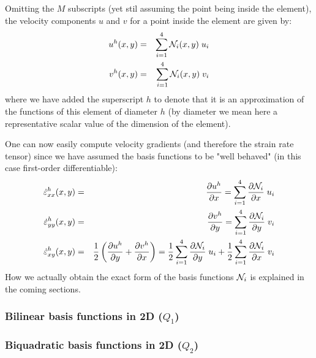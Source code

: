 Omitting the $M$ subscripts (yet stil assuming the point being inside the element), the velocity 
components $u$ and $v$ for a point inside the element
 are given by:
\begin{eqnarray}
u^h(x,y) &=& \sum_{i=1}^4 {\mathcal{N}}_i(x,y)\;  u_i \\
v^h(x,y) &=& \sum_{i=1}^4 {\mathcal{N}}_i(x,y)\;  v_i \label{bf01}
\end{eqnarray}
where we have added the superscript $h$ to denote that it is an approximation of the functions 
of this element of diameter $h$ (by diameter we mean here a representative scalar value of the dimension
of the element). 

One can now easily compute velocity gradients (and therefore the 
strain rate tensor) since we have assumed the basis functions to be "well behaved" 
(in this case first-order differentiable):
\begin{eqnarray}
\dot{\varepsilon}^h_{xx}(x,y) 
&=& \frac{\partial u^h}{\partial x} = \sum_{i=1}^4 \frac{\partial {\mathcal{N}}_i}{\partial x}\;  u_i \\
\dot{\varepsilon}^h_{yy}(x,y) 
&=& \frac{\partial v^h}{\partial y} = \sum_{i=1}^4 \frac{\partial {\mathcal{N}}_i}{\partial y}\;  v_i \\
\dot{\varepsilon}^h_{xy}(x,y) 
&=& \frac{1}{2}\left(\frac{\partial u^h}{\partial y} + \frac{\partial v^h}{\partial x} \right) 
= \frac{1}{2}\sum_{i=1}^4 \frac{\partial {\mathcal{N}}_i}{\partial y}\;  u_i
+ \frac{1}{2}\sum_{i=1}^4 \frac{\partial {\mathcal{N}}_i}{\partial x}\;  v_i
\end{eqnarray}
How we actually obtain the exact form of the basis functions ${\mathcal{N}}_i$ is explained in the coming sections.

\subsubsection{Bilinear basis functions in 2D ($Q_1$)} \label{ss:q12d}



\subsubsection{Biquadratic basis functions in 2D ($Q_2$)}\label{ss:q22d}




